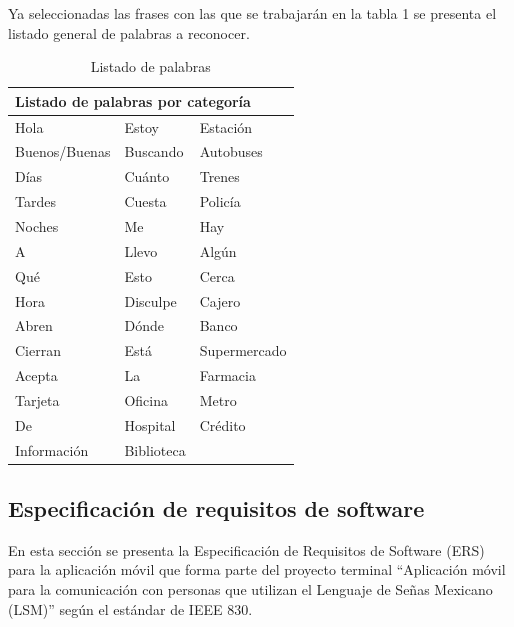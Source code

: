 Ya seleccionadas las frases con las que se trabajarán en la tabla 1 se presenta el listado general de palabras a reconocer.

\begin{table}[H]
\centering
\caption{Listado de palabras}
\label{tb:listadoPalabras}
\begin{tabular}{|l|l|l|}
\hline
\multicolumn{3}{|l|}{Listado de palabras por categoría} \\ \hline
Hola               & Estoy           & Estación         \\ \hline
Buenos/Buenas      & Buscando        & Autobuses        \\ \hline
Días               & Cuánto          & Trenes           \\ \hline
Tardes             & Cuesta          & Policía          \\ \hline
Noches             & Me              & Hay              \\ \hline
A                  & Llevo           & Algún            \\ \hline
Qué                & Esto            & Cerca            \\ \hline
Hora               & Disculpe        & Cajero           \\ \hline
Abren              & Dónde           & Banco            \\ \hline
Cierran            & Está            & Supermercado     \\ \hline
Acepta             & La              & Farmacia         \\ \hline
Tarjeta            & Oficina         & Metro            \\ \hline
De                 & Hospital        & Crédito          \\ \hline
Información        & Biblioteca      &                  \\ \hline
\end{tabular}
\end{table}


\subsection{Especificación de requisitos de software}

En esta sección se presenta la Especificación de Requisitos de Software (ERS) para la aplicación móvil que forma parte del proyecto terminal “Aplicación móvil para la comunicación con personas que utilizan el Lenguaje de Señas Mexicano (LSM)” según el estándar de IEEE 830.

